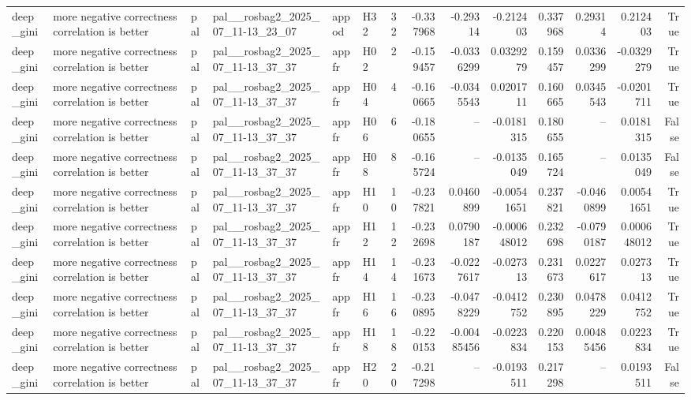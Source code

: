 \begin{longtable}{llllllrrrrrrrr}
deep\_gini & more negative correctness correlation is better & pal & pal\_\_rosbag2\_2025\_07\_11-13\_23\_07 & appod & H32 & 32 & -0.337968 & -0.29314 & -0.212403 & 0.337968 & 0.29314 & 0.212403 & True \\
deep\_gini & more negative correctness correlation is better & pal & pal\_\_rosbag2\_2025\_07\_11-13\_37\_37 & appfr & H02 & 2 & -0.159457 & -0.0336299 & 0.0329279 & 0.159457 & 0.0336299 & -0.0329279 & True \\
deep\_gini & more negative correctness correlation is better & pal & pal\_\_rosbag2\_2025\_07\_11-13\_37\_37 & appfr & H04 & 4 & -0.160665 & -0.0345543 & 0.0201711 & 0.160665 & 0.0345543 & -0.0201711 & True \\
deep\_gini & more negative correctness correlation is better & pal & pal\_\_rosbag2\_2025\_07\_11-13\_37\_37 & appfr & H06 & 6 & -0.180655 & -- & -0.0181315 & 0.180655 & -- & 0.0181315 & False \\
deep\_gini & more negative correctness correlation is better & pal & pal\_\_rosbag2\_2025\_07\_11-13\_37\_37 & appfr & H08 & 8 & -0.165724 & -- & -0.0135049 & 0.165724 & -- & 0.0135049 & False \\
deep\_gini & more negative correctness correlation is better & pal & pal\_\_rosbag2\_2025\_07\_11-13\_37\_37 & appfr & H10 & 10 & -0.237821 & 0.0460899 & -0.00541651 & 0.237821 & -0.0460899 & 0.00541651 & True \\
deep\_gini & more negative correctness correlation is better & pal & pal\_\_rosbag2\_2025\_07\_11-13\_37\_37 & appfr & H12 & 12 & -0.232698 & 0.0790187 & -0.000648012 & 0.232698 & -0.0790187 & 0.000648012 & True \\
deep\_gini & more negative correctness correlation is better & pal & pal\_\_rosbag2\_2025\_07\_11-13\_37\_37 & appfr & H14 & 14 & -0.231673 & -0.0227617 & -0.027313 & 0.231673 & 0.0227617 & 0.027313 & True \\
deep\_gini & more negative correctness correlation is better & pal & pal\_\_rosbag2\_2025\_07\_11-13\_37\_37 & appfr & H16 & 16 & -0.230895 & -0.0478229 & -0.0412752 & 0.230895 & 0.0478229 & 0.0412752 & True \\
deep\_gini & more negative correctness correlation is better & pal & pal\_\_rosbag2\_2025\_07\_11-13\_37\_37 & appfr & H18 & 18 & -0.220153 & -0.00485456 & -0.0223834 & 0.220153 & 0.00485456 & 0.0223834 & True \\
deep\_gini & more negative correctness correlation is better & pal & pal\_\_rosbag2\_2025\_07\_11-13\_37\_37 & appfr & H20 & 20 & -0.217298 & -- & -0.0193511 & 0.217298 & -- & 0.0193511 & False \\

\end{longtable}
